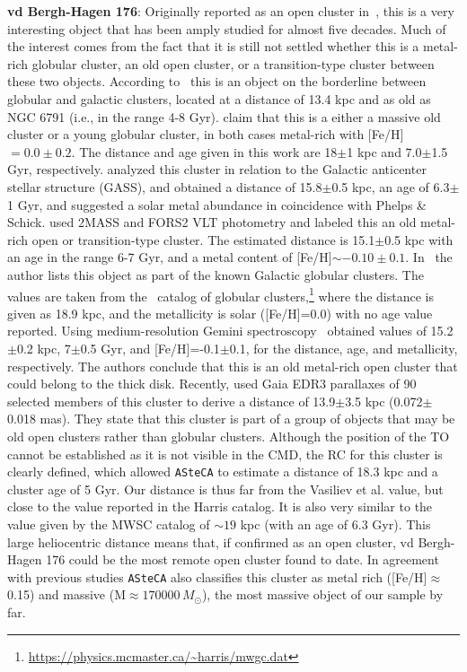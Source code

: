 \documentclass{aa}
\begin{document}
\begin{appendix}
  \noindent \textbf{vd Bergh-Hagen 176}: Originally reported as an open cluster
  in~\cite{vandenBergh_1975}, this is a very interesting object that has been
  amply studied for  almost five decades. Much of the interest
  comes from the fact that it is still not settled whether this is a metal-rich
  globular cluster, an old open cluster, or a transition-type cluster  between
  these two objects.
  According to~\cite{Ortolani_1995} this is an object on the borderline
  between globular and galactic clusters, located at a distance of 13.4 kpc
  and as old as NGC 6791 (i.e., in the range 4-8 Gyr).
  \cite{Phelps_2003} claim that this is a either a massive old cluster or a
  young globular cluster, in both cases metal-rich with [Fe/H]$=0.0\pm0.2$.
  The distance and age given in this work are 18$\pm$1 kpc and 7.0$\pm$1.5 Gyr,
  respectively.
  \cite{Frinchaboy_2006} analyzed this cluster in relation to the Galactic
  anticenter stellar structure (GASS), and obtained a distance of 15.8$\pm$0.5
  kpc, an age of 6.3$\pm$1 Gyr, and suggested a solar metal abundance in
  coincidence with Phelps \& Schick.
  \cite{Davoust_2011} used 2MASS and FORS2 VLT photometry and labeled this an
  old metal-rich open or transition-type cluster. The estimated  distance is
  15.1$\pm$0.5 kpc with an age in the range 6-7 Gyr, and a metal content of
  [Fe/H]$\sim-0.10\pm0.1$.
  In~\cite{vandenBergh_2011} the author lists this object as part of the known
  Galactic globular clusters. The values are taken from
  the~\cite{Harris_1996,Harris_2010} catalog of globular
  clusters,\footnote{\url{https://physics.mcmaster.ca/~harris/mwgc.dat}}
  where the distance is given as 18.9 kpc,
  and the metallicity is solar ([Fe/H]=0.0) with no age value reported.
  Using medium-resolution Gemini spectroscopy~\cite{Sharina_2014} obtained
  values of 15.2$\pm$0.2 kpc, 7$\pm$0.5 Gyr, and [Fe/H]=-0.1$\pm$0.1, for the
  distance, age, and metallicity, respectively. The authors conclude that this
  is an old metal-rich open cluster that could belong to the thick disk.
  Recently, \cite{Vasiliev_2021} used Gaia EDR3 parallaxes of 90 selected
  members of this cluster to derive a distance of 13.9$\pm$3.5 kpc
  (0.072$\pm$0.018 mas). They state that this cluster is part of a group of
  objects that may be old open clusters rather than globular clusters.
  Although the position of the TO cannot be established as it is not visible
  in the CMD, the RC for this cluster is clearly defined, which allowed
  \texttt{ASteCA} to estimate a distance of 18.3 kpc and a cluster age of 5
  Gyr. Our distance is thus far from the Vasiliev et al. value, but close to the
  value reported in the Harris catalog. It is also very similar to the value
  given by the MWSC catalog of $\sim19$ kpc (with an age of 6.3 Gyr).
  This large heliocentric distance means that, if confirmed as an open
  cluster, vd Bergh-Hagen 176 could be the most remote open cluster found to
  date. In agreement with previous studies \texttt{ASteCA} also classifies this
  cluster as metal rich ([Fe/H]$\approx$0.15) and massive (M$\approx170000\,
  M_{\odot}$), the most massive object of our sample by far.\\


\end{appendix}
\end{document}
